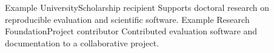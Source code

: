   {Example University}{Scholarship recipient}{
  Supports doctoral research on reproducible evaluation and scientific software.
}
  {Example Research Foundation}{Project contributor}{
  Contributed evaluation software and documentation to a collaborative project.
}

